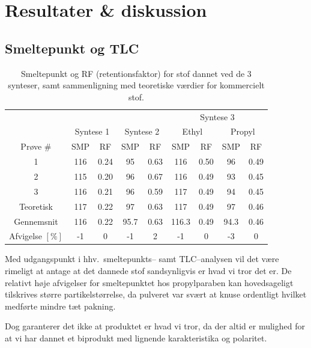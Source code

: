 \section{Resultater \& diskussion}
    \subsection{Smeltepunkt og TLC}
    \begin{table}[H]\centering
        \caption{Smeltepunkt og RF (retentionsfaktor) for stof dannet ved de 3 synteser, samt sammenligning med teoretiske værdier for kommercielt stof.}
        \begin{tabular*}{\linewidth}{c@{\extracolsep{\fill}}cccccccc}
            \toprule
            & & & & & \multicolumn{4}{c}{Syntese 3} \\
            \cmidrule(r){6-9}
            & \multicolumn{2}{c}{Syntese 1} & \multicolumn{2}{c}{Syntese 2} & \multicolumn{2}{c}{Ethyl} & \multicolumn{2}{c}{Propyl} \\
            \cmidrule(r){2-3} \cmidrule(r){4-5} \cmidrule(r){6-7} \cmidrule(r){8-9}
            Prøve \# & SMP & RF & SMP & RF & SMP & RF & SMP & RF \\
            \midrule
            1 & 116 & 0.24 & 95 & 0.63 & 116 & 0.50 & 96 & 0.49 \\
            2 & 115 & 0.20 & 96 & 0.67 & 116 & 0.49 & 93 & 0.45 \\
            3 & 116 & 0.21 & 96 & 0.59 & 117 & 0.49 & 94 & 0.45 \\
            \midrule
            Teoretisk & 117 & 0.22 & 97 & 0.63 & 117 & 0.49 & 97 & 0.46 \\
            Gennemsnit & 116 & 0.22 & 95.7 & 0.63 & 116.3 & 0.49 & 94.3 & 0.46 \\
            \midrule
            Afvigelse $\left[\si{\%}\right]$ & -1 & 0 & -1 & 2 & -1 & 0 & -3 & 0 \\
            \bottomrule
        \end{tabular*}
    \end{table}
    Med udgangspunkt i hhv.\ smeltepunkts-- samt TLC--analysen vil det være rimeligt at antage at det dannede stof sandsynligvis er hvad vi tror det er. De relativt høje afvigelser for smeltepunktet hos propylparaben kan hovedsageligt tilskrives større partikelstørrelse, da pulveret var svært at knuse ordentligt hvilket medførte mindre tæt pakning.

    Dog garanterer det ikke at produktet er hvad vi tror, da der altid er mulighed for at vi har dannet et biprodukt med lignende karakteristika og polaritet.


